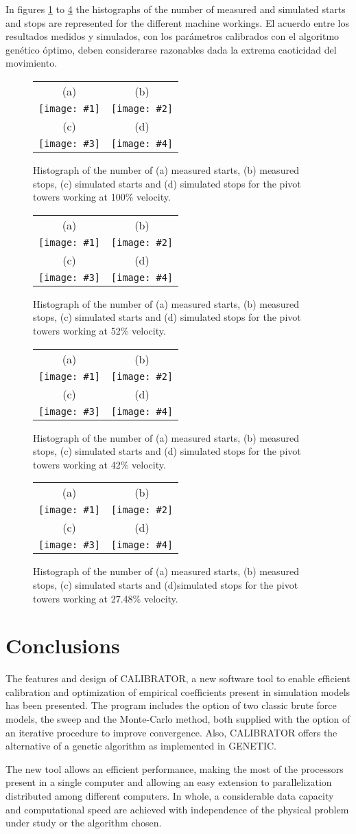 \documentclass[review,authoryear]{elsarticle}
\newcommand{\FIGIV}[6]
{
	\begin{figure}[ht!]
		\centering
		\begin{tabular}{cc}
			(a) & (b)
			\\ \texttt{[image: \#1]} & \texttt{[image: \#2]}
			\\ (c) & (d)
			\\ \texttt{[image: \#3]} & \texttt{[image: \#4]}
		\end{tabular}
		\caption{#5.\label{#6}}
	\end{figure}
}
\begin{document}
In figures \ref{FigPivot100} to \ref{FigPivot27} the histographs of the number
of measured and simulated starts and stops are represented for the different
machine workings. El acuerdo entre los resultados medidos y simulados, con los
parámetros calibrados con el algoritmo genético óptimo, deben considerarse
razonables dada la extrema caoticidad del movimiento.

\FIGIV{pivot-measured-starts-100.eps}{pivot-measured-stops-100.eps}
{pivot-simulated-starts-100.eps}{pivot-simulated-stops-100.eps}
{Histograph of the number of (a) measured starts, (b) measured stops, (c)
simulated starts and (d) simulated stops for the pivot towers working at 100\%
velocity}{FigPivot100}

\FIGIV{pivot-measured-starts-52.eps}{pivot-measured-stops-52.eps}
{pivot-simulated-starts-52.eps}{pivot-simulated-stops-52.eps}
{Histograph of the number of (a) measured starts, (b) measured stops, (c)
simulated starts and (d) simulated stops for the pivot towers working at 52\%
velocity}{FigPivot52}

\FIGIV{pivot-measured-starts-42.eps}{pivot-measured-stops-42.eps}
{pivot-simulated-starts-42.eps}{pivot-simulated-stops-42.eps}
{Histograph of the number of (a) measured starts, (b) measured stops, (c)
simulated starts and (d) simulated stops for the pivot towers working at 42\%
velocity}{FigPivot42}

\FIGIV{pivot-measured-starts-27,48.eps}{pivot-measured-stops-27,48.eps}
{pivot-simulated-starts-27,48.eps}{pivot-simulated-stops-27,48.eps}
{Histograph of the number of (a) measured starts, (b) measured stops, (c)
simulated starts and (d)simulated stops for the pivot towers working at 27.48\% velocity}{FigPivot27}

\section{Conclusions}

The features and design of CALIBRATOR, a new software tool to enable efficient calibration and optimization of empirical coefficients present in simulation models has been presented. The program includes the option of two classic brute force models, the sweep and the Monte-Carlo method, both supplied with the option of an iterative procedure to improve convergence. Also, CALIBRATOR offers the alternative of a genetic algorithm as implemented in GENETIC.

The new tool allows an efficient performance, making the most of the processors present in a single computer and allowing an easy extension to parallelization distributed among different computers. In whole, a considerable data capacity and computational speed are achieved with independence of the physical problem under study or the algorithm chosen.
\end{document}
